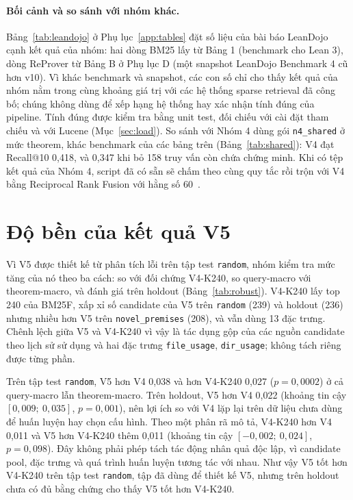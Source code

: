 \documentclass[11pt,a4paper,oneside]{report}
\newcommand{\code}[1]{\texttt{#1}}
\begin{document}
\paragraph{Bối cảnh và so sánh với nhóm khác.} Bảng~\ref{tab:leandojo} ở Phụ lục~\ref{app:tables} đặt số liệu của bài báo
LeanDojo~\cite{yang2023} cạnh kết quả của nhóm: hai dòng BM25 lấy từ Bảng 1 (benchmark cho Lean 3), dòng ReProver từ Bảng B
ở Phụ lục D (một snapshot LeanDojo Benchmark 4 cũ hơn v10). Vì khác benchmark và snapshot, các con số chỉ cho thấy kết quả của
nhóm nằm trong cùng khoảng giá trị với các hệ thống sparse retrieval đã công bố; chúng không dùng để xếp hạng hệ thống hay
xác nhận tính đúng của pipeline. Tính đúng được kiểm tra bằng unit test, đối chiếu với cài đặt tham chiếu và với Lucene
(Mục~\ref{sec:load}). So sánh với Nhóm 4 dùng gói \code{n4\_shared} ở mức theorem, khác benchmark của các bảng trên
(Bảng~\ref{tab:shared}): V4 đạt Recall@10 0,418, và 0,347 khi bỏ 158 truy vấn còn chứa chứng minh. Khi có tệp kết quả của
Nhóm 4, script đã có sẵn sẽ chấm theo cùng quy tắc rồi trộn với V4 bằng Reciprocal Rank Fusion với hằng
số 60~\cite{cormack2009}.\label{sec:group4}

\section{Độ bền của kết quả V5}\label{sec:robust}

Vì V5 được thiết kế từ phân tích lỗi trên tập test \code{random}, nhóm kiểm tra mức tăng của nó theo ba cách: so với
đối chứng V4-K240, so query-macro với theorem-macro, và đánh giá trên holdout (Bảng~\ref{tab:robust}). V4-K240 lấy top 240
của BM25F, xấp xỉ số candidate của V5 trên \code{random} (239) và holdout (236) nhưng nhiều hơn V5 trên
\code{novel\_premises} (208), và vẫn dùng 13 đặc trưng. Chênh lệch giữa V5 và V4-K240 vì vậy là tác dụng gộp của các nguồn
candidate theo lịch sử sử dụng và hai đặc trưng \code{file\_usage}, \code{dir\_usage}; không tách riêng được từng phần.



Trên tập test \code{random}, V5 hơn V4 0,038 và hơn V4-K240 0,027 ($p = 0{,}0002$) ở cả query-macro lẫn theorem-macro. Trên
holdout, V5 hơn V4 0,022 (khoảng tin cậy $[0{,}009;\ 0{,}035]$, $p = 0{,}001$), nên lợi ích so với V4 lặp lại trên dữ liệu
chưa dùng để huấn luyện hay chọn cấu hình. Theo một phân rã mô tả, V4-K240 hơn V4 0,011 và V5 hơn V4-K240 thêm 0,011
(khoảng tin cậy $[-0{,}002;\ 0{,}024]$, $p = 0{,}098$). Đây không phải phép tách tác động nhân quả độc lập, vì candidate pool,
đặc trưng và quá trình huấn luyện tương tác với nhau. Như vậy V5 tốt hơn V4-K240 trên tập test \code{random}, tập đã dùng để
thiết kế V5, nhưng trên holdout chưa có đủ bằng chứng cho thấy V5 tốt hơn V4-K240.
\end{document}
